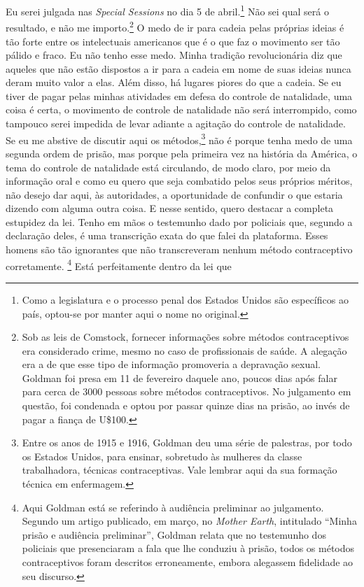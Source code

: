 Eu serei julgada nas \emph{Special Sessions} no dia 5 de
abril.\footnote{Como a legislatura e o processo penal dos Estados Unidos
  são específicos ao país, optou-se por manter aqui o nome no original.}
Não sei qual será o resultado, e não me importo.\footnote{Sob as leis de
  Comstock, fornecer informações sobre métodos contraceptivos era
  considerado crime, mesmo no caso de profissionais de saúde. A alegação
  era a de que esse tipo de informação promoveria a depravação sexual.
  Goldman foi presa em 11 de fevereiro daquele ano, poucos dias após
  falar para cerca de 3000 pessoas sobre métodos contraceptivos. No
  julgamento em questão, foi condenada e optou por passar quinze dias na
  prisão, ao invés de pagar a fiança de U\$100.} O medo de ir para
cadeia pelas próprias ideias é tão forte entre os intelectuais
americanos que é o que faz o movimento ser tão pálido e fraco. Eu não
tenho esse medo. Minha tradição revolucionária diz que aqueles que não
estão dispostos a ir para a cadeia em nome de suas ideias nunca deram
muito valor a elas. Além disso, há lugares piores do que a cadeia. Se eu
tiver de pagar pelas minhas atividades em defesa do controle de
natalidade, uma coisa é certa, o movimento de controle de natalidade não
será interrompido, como tampouco serei impedida de levar adiante a
agitação do controle de natalidade. Se eu me abstive de discutir aqui os
métodos,\footnote{Entre os anos de 1915 e 1916, Goldman deu uma série de
  palestras, por todo os Estados Unidos, para ensinar, sobretudo às
  mulheres da classe trabalhadora, técnicas contraceptivas. Vale lembrar
  aqui da sua formação técnica em enfermagem.} não é porque tenha medo
de uma segunda ordem de prisão, mas porque pela primeira vez na história
da América, o tema do controle de natalidade está circulando, de modo
claro, por meio da informação oral e como eu quero que seja combatido
pelos seus próprios méritos, não desejo dar aqui, às autoridades, a
oportunidade de confundir o que estaria dizendo com alguma outra coisa.
E nesse sentido, quero destacar a completa estupidez da lei. Tenho em
mãos o testemunho dado por policiais que, segundo a declaração deles, é
uma transcrição exata do que falei da plataforma. Esses homens são tão
ignorantes que não transcreveram nenhum método contraceptivo
corretamente. \footnote{Aqui Goldman está se referindo à audiência
  preliminar ao julgamento. Segundo um artigo publicado, em março, no
  \emph{Mother Earth}, intitulado ``Minha prisão e audiência
  preliminar'', Goldman relata que no testemunho dos policiais que
  presenciaram a fala que lhe conduziu à prisão, todos os métodos
  contraceptivos foram descritos erroneamente, embora alegassem
  fidelidade ao seu discurso.} Está perfeitamente dentro da lei que
